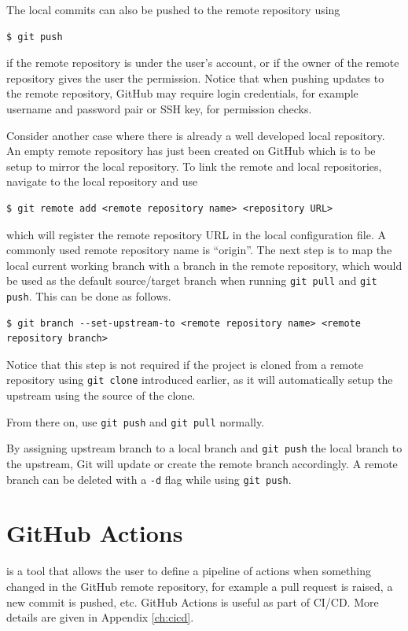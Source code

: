The local commits can also be pushed to the remote repository using
\begin{lstlisting}
$ git push
\end{lstlisting}
if the remote repository is under the user's account, or if the owner of the remote repository gives the user the permission. Notice that when pushing updates to the remote repository, GitHub may require login credentials, for example username and password pair or SSH key, for permission checks.

Consider another case where there is already a well developed local repository. An empty remote repository has just been created on GitHub which is to be setup to mirror the local repository. To link the remote and local repositories, navigate to the local repository and use
\begin{lstlisting}
$ git remote add <remote repository name> <repository URL>
\end{lstlisting}
which will register the remote repository URL in the local configuration file. A commonly used remote repository name is ``origin''. The next step is to map the local current working branch with a branch in the remote repository, which would be used as the default source/target branch when running \verb|git pull| and \verb|git push|. This can be done as follows.
\begin{lstlisting}
$ git branch --set-upstream-to <remote repository name> <remote repository branch>
\end{lstlisting}
Notice that this step is not required if the project is cloned from a remote repository using \verb|git clone| introduced earlier, as it will automatically setup the upstream using the source of the clone.

From there on, use \verb|git push| and \verb|git pull| normally.

By assigning upstream branch to a local branch and \verb|git push| the local branch to the upstream, Git will update or create the remote branch accordingly. A remote branch can be deleted with a \verb|-d| flag while using \verb|git push|.

\section{GitHub Actions}

 is a tool that allows the user to define a pipeline of actions when something changed in the GitHub remote repository, for example a pull request is raised, a new commit is pushed, etc. GitHub Actions is useful as part of CI/CD. More details are given in Appendix \ref{ch:cicd}.
